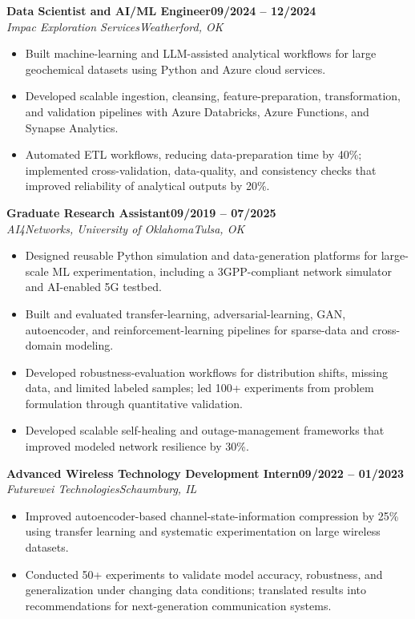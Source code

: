 \documentclass[10pt,letterpaper]{extarticle}
\newcommand{\role}[4]{\Needspace{3\baselineskip}\textbf{#1}\hfill\textbf{#2}\\[-1pt]\textit{#3}\hfill\textit{#4}\par}
\begin{document}
\role{Data Scientist and AI/ML Engineer}{09/2024 -- 12/2024}{Impac Exploration Services}{Weatherford, OK}
\begin{itemize}
\item Built machine-learning and LLM-assisted analytical workflows for large geochemical datasets using Python and Azure cloud services.
\item Developed scalable ingestion, cleansing, feature-preparation, transformation, and validation pipelines with Azure Databricks, Azure Functions, and Synapse Analytics.
\item Automated ETL workflows, reducing data-preparation time by 40\%; implemented cross-validation, data-quality, and consistency checks that improved reliability of analytical outputs by 20\%.
\end{itemize}

\role{Graduate Research Assistant}{09/2019 -- 07/2025}{AI4Networks, University of Oklahoma}{Tulsa, OK}
\begin{itemize}
\item Designed reusable Python simulation and data-generation platforms for large-scale ML experimentation, including a 3GPP-compliant network simulator and AI-enabled 5G testbed.
\item Built and evaluated transfer-learning, adversarial-learning, GAN, autoencoder, and reinforcement-learning pipelines for sparse-data and cross-domain modeling.
\item Developed robustness-evaluation workflows for distribution shifts, missing data, and limited labeled samples; led 100+ experiments from problem formulation through quantitative validation.
\item Developed scalable self-healing and outage-management frameworks that improved modeled network resilience by 30\%.
\end{itemize}

\role{Advanced Wireless Technology Development Intern}{09/2022 -- 01/2023}{Futurewei Technologies}{Schaumburg, IL}
\begin{itemize}
\item Improved autoencoder-based channel-state-information compression by 25\% using transfer learning and systematic experimentation on large wireless datasets.
\item Conducted 50+ experiments to validate model accuracy, robustness, and generalization under changing data conditions; translated results into recommendations for next-generation communication systems.
\end{itemize}
\end{document}
